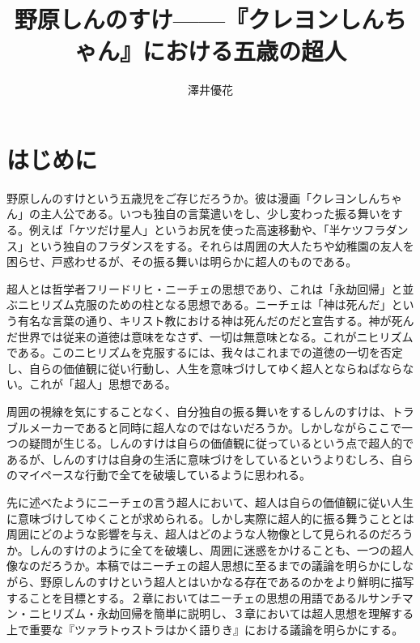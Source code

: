 \documentclass[b5j,twoside,twocolumn]{utarticle}
\title{\tbaselineshift =4.0pt 野原しんのすけ------『クレヨンしんちゃん』における五歳の超人}
\author{澤井優花}
\date{\vspace{-5mm}}
\makeatletter
\def\yakuchu{%
\@ifnextchar[\@xfootnote %
{\stepcounter{yakuchu}%
\protected@xdef\@thefnmark{\theyakuchu}%
\@footnotemark\@footnotetext}}
\makeatother
\begin{document}
\maketitle

\setlength{\footskip}{-2mm}
\chead[]{}
\lfoot[]{\thepage{}}
\cfoot[]{}
\rfoot[\thepage{}]{}

\let\yakuchu=\endnote
\renewcommand{\footnoterule}{\noindent\rule{100mm}{0.3mm}\vskip2mm}
\thispagestyle{fancy}
\section{はじめに}
野原しんのすけという五歳児をご存じだろうか。彼は漫画「クレヨンしんちゃん」の主人公である。いつも独自の言葉遣いをし、少し変わった振る舞いをする。例えば「ケツだけ星人」というお尻を使った高速移動や、「半ケツフラダンス」という独自のフラダンスをする。それらは周囲の大人たちや幼稚園の友人を困らせ、戸惑わせるが、その振る舞いは明らかに超人のものである。


超人とは哲学者フリードリヒ・ニーチェの思想であり、これは「永劫回帰」と並ぶニヒリズム克服のための柱となる思想である。ニーチェは「神は死んだ」という有名な言葉の通り、キリスト教における神は死んだのだと宣告する。神が死んだ世界では従来の道徳は意味をなさず、一切は無意味となる。これがニヒリズムである。このニヒリズムを克服するには、我々はこれまでの道徳の一切を否定し、自らの価値観に従い行動し、人生を意味づけしてゆく超人とならねばならない。これが「超人」思想である。


周囲の視線を気にすることなく、自分独自の振る舞いをするしんのすけは、トラブルメーカーであると同時に超人なのではないだろうか。しかしながらここで一つの疑問が生じる。しんのすけは自らの価値観に従っているという点で超人的であるが、しんのすけは自身の生活に意味づけをしているというよりむしろ、自らのマイペースな行動で全てを破壊しているように思われる。


先に述べたようにニーチェの言う超人において、超人は自らの価値観に従い人生に意味づけしてゆくことが求められる。しかし実際に超人的に振る舞うこととは周囲にどのような影響を与え、超人はどのような人物像として見られるのだろうか。しんのすけのように全てを破壊し、周囲に迷惑をかけることも、一つの超人像なのだろうか。本稿ではニーチェの超人思想に至るまでの議論を明らかにしながら、野原しんのすけという超人とはいかなる存在であるのかをより鮮明に描写することを目標とする。２章においてはニーチェの思想の用語であるルサンチマン・ニヒリズム・永劫回帰を簡単に説明し、３章においては超人思想を理解する上で重要な『ツァラトゥストラはかく語りき』における議論を明らかにする。
\end{document}
